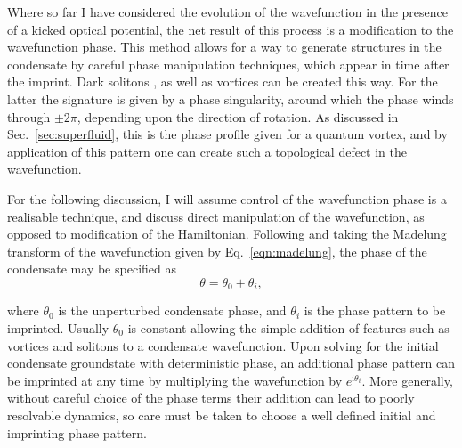 Where so far I have considered the evolution of the wavefunction in the presence of a kicked optical potential, the net result of this process is a modification to the wavefunction phase. This method allows for a way to generate structures in the condensate by careful phase manipulation techniques, which appear in time after the imprint. Dark solitons \cite{BEC:Denschlag_science_2000}, as well as vortices \cite{Vtx:Dobrek_pra_1999} can be created this way. For the latter the signature is given by a phase singularity, around which the phase winds through $\pm 2\pi$, depending upon the direction of rotation. As discussed in Sec.~\ref{sec:superfluid}, this is the phase profile given for a quantum vortex, and by application of this pattern one can create such a topological defect in the wavefunction.

For the following discussion, I will assume control of the wavefunction phase is a realisable technique, and discuss direct manipulation of the wavefunction, as opposed to modification of the Hamiltonian. Following \cite{BK:Pitaevskii_Stringari_2003} and taking the Madelung transform of the wavefunction given by Eq.~\eqref{eqn:madelung}, the phase of the condensate may be specified as
\begin{equation}
\theta = \theta_0 + \theta_i,
\end{equation}

where $\theta_0$ is the unperturbed condensate phase, and $\theta_i$ is the phase pattern to be imprinted. Usually $\theta_0$ is constant allowing the simple addition of features such as vortices and solitons to a condensate wavefunction. Upon solving for the initial condensate groundstate with deterministic phase, an additional phase pattern can be imprinted at any time by multiplying the wavefunction by $e^{\text{i}\theta_i}$. More generally, without careful choice of the phase terms their addition can lead to poorly resolvable dynamics, so care must be taken to choose a well defined initial and imprinting phase pattern.

